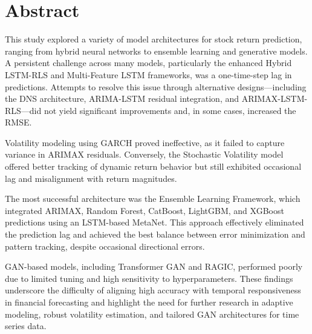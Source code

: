\chapter*{Abstract}

This study explored a variety of model architectures for stock return prediction, ranging from hybrid neural networks to ensemble learning and generative models. A persistent challenge across many models, particularly the enhanced Hybrid LSTM-RLS and Multi-Feature LSTM frameworks, was a one-time-step lag in predictions. Attempts to resolve this issue through alternative designs—including the DNS architecture, ARIMA-LSTM residual integration, and ARIMAX-LSTM-RLS—did not yield significant improvements and, in some cases, increased the RMSE.

Volatility modeling using GARCH proved ineffective, as it failed to capture variance in ARIMAX residuals. Conversely, the Stochastic Volatility model offered better tracking of dynamic return behavior but still exhibited occasional lag and misalignment with return magnitudes.

The most successful architecture was the Ensemble Learning Framework, which integrated ARIMAX, Random Forest, CatBoost, LightGBM, and XGBoost predictions using an LSTM-based MetaNet. This approach effectively eliminated the prediction lag and achieved the best balance between error minimization and pattern tracking, despite occasional directional errors.

GAN-based models, including Transformer GAN and RAGIC, performed poorly due to limited tuning and high sensitivity to hyperparameters. These findings underscore the difficulty of aligning high accuracy with temporal responsiveness in financial forecasting and highlight the need for further research in adaptive modeling, robust volatility estimation, and tailored GAN architectures for time series data.